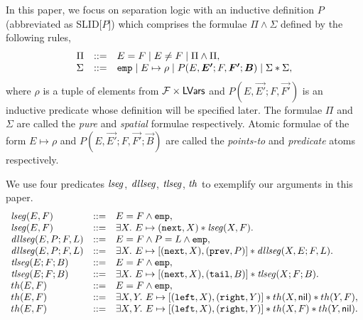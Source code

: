 \documentclass{llncs}
\begin{document}
In this paper, we focus on separation logic with an inductive definition $P$ (abbreviated as SLID[$P$]) which comprises the formulae $\Pi \wedge \Sigma$ defined by the following rules,
\[
\begin{array}{l c l}
\Pi &::=& E = F \mid E \neq F \mid \Pi \wedge \Pi,\\
\Sigma & ::=& \slemp\mid  E \mapsto \rho \mid P(E,\vec{E'}; F, \vec{F'}; \vec{B}) \mid \Sigma * \Sigma,
\end{array}
\]
where $\rho$ is a tuple of elements from $\mathcal{F} \times \mathsf{LVars}$ and $P(E,\vec{E'}; F, \vec{F'})$ is an inductive predicate whose definition will be specified later. The formulae $\Pi$ and $\Sigma$ are called the \emph{pure} and \emph{spatial} formulae respectively. Atomic formulae of the form $E \mapsto \rho$ and $P(E,\vec{E'}; F, \vec{F'}; \vec{B})$ are called the \emph{points-to} and \emph{predicate} atoms respectively.


\begin{example}
We use four predicates $\mathit{lseg}$, $\mathit{dllseg}$, $\mathit{tlseg}$, $\mathit{th}$ to exemplify our arguments in this paper.
\[
\begin{array}{l c l }
\lseg(E,F) & ::= & E = F \wedge \slemp, \\
\lseg(E,F) & ::= & \exists X.\ E \mapsto (\fnext,X) * \lseg(X, F).\\
%
\dllseg(E,P; F, L) & ::= & E = F \wedge P = L \wedge \slemp, \\
\dllseg(E,P; F, L) & ::= & \exists X.\ E \mapsto [(\fnext,X), (\fprev, P)] * \dllseg(X,E; F, L ).\\
%
\tlseg(E; F; B) & ::= & E = F \wedge  \slemp, \\
\tlseg(E; F; B) & ::= & \exists X.\ E \mapsto [(\fnext,X), (\ftail, B)] * \tlseg(X; F; B).\\
%
th(E,F) & ::=  & E = F \wedge \slemp, \\
th(E,F) & ::=  & \exists X, Y.\ E \mapsto [(\slleft,X), (\slright, Y)] * th(X, \nil) * th(Y, F), \\
th(E,F) & ::=  & \exists X, Y.\ E \mapsto [(\slleft,X), (\slright, Y)] * th(X, F) * th(Y, \nil).\\
%
\end{array}
\]

\end{example}
\end{document}
